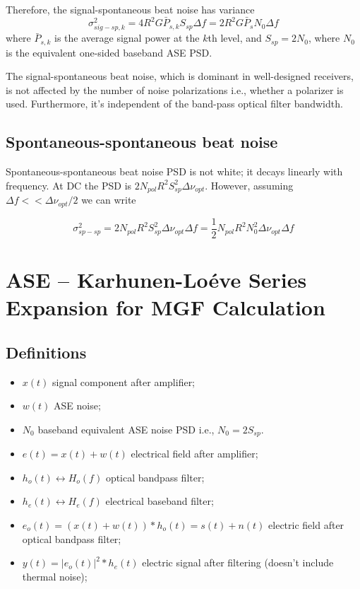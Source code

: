 \documentclass[a4paper]{article}
\begin{document}
Therefore, the signal-spontaneous beat noise has variance
\begin{equation}
\sigma^2_{sig-sp, k} = 4R^2G\bar{P}_{s,k}S_{sp}\Delta f = 2R^2G\bar{P}_sN_0\Delta f
\end{equation}
where $\bar{P}_{s,k}$ is the average signal power at the $k$th level, and $S_{sp} = 2N_0$, where $N_0$ is the equivalent one-sided baseband ASE PSD.

The signal-spontaneous beat noise, which is dominant in well-designed receivers, is not affected by the number of noise polarizations i.e., whether a polarizer is used. Furthermore, it's independent of the band-pass optical filter bandwidth.

\subsection{Spontaneous-spontaneous beat noise}

Spontaneous-spontaneous beat noise PSD is not white; it decays linearly with frequency. At DC the PSD is $2N_{pol}R^2S_{sp}^2\Delta\nu_{opt}$. However, assuming $\Delta f << \Delta\nu_{opt}/2$ we can write

\begin{equation}
\sigma^2_{sp-sp} = 2N_{pol}R^2S_{sp}^2\Delta\nu_{opt}\Delta f = \frac{1}{2}N_{pol}R^2N_0^2\Delta\nu_{opt}\Delta f 
\end{equation}

\section{ASE -- Karhunen-Loéve Series Expansion for MGF Calculation} 

\subsection{Definitions}
\begin{itemize}
	\item $x(t)$ signal component after amplifier;
	\item $w(t)$ ASE noise;
	\item $N_0$ baseband equivalent ASE noise PSD i.e., $N_0 = 2S_{sp}$.
	\item $e(t) = x(t) + w(t)$ electrical field after amplifier;
	\item $h_o(t) \leftrightarrow H_o(f)$ optical bandpass filter;
	\item $h_e(t) \leftrightarrow H_e(f)$ electrical baseband filter;
	\item $e_o(t) = (x(t) + w(t))\ast h_o(t) = s(t) + n(t)$ electric field after  optical bandpass filter;
	\item $y(t) = |e_o(t)|^2\ast h_e(t)$ electric signal after filtering (doesn't include thermal noise);
\end{itemize}
\end{document}
